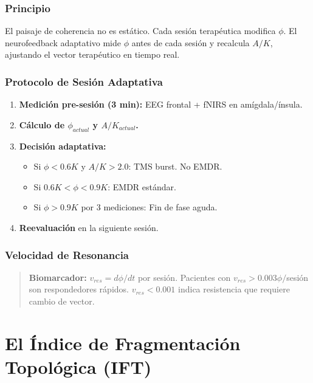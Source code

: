 \documentclass[12pt,openany]{book}
\begin{document}
\section{Principio}
El paisaje de coherencia no es estático. Cada sesión terapéutica modifica
$\phi$. El neurofeedback adaptativo mide $\phi$ antes de cada sesión y
recalcula $A/K$, ajustando el vector terapéutico en tiempo real.

\section{Protocolo de Sesión Adaptativa}
\begin{enumerate}
  \item \textbf{Medición pre-sesión (3 min):} EEG frontal + fNIRS en
        amígdala/ínsula.
  \item \textbf{Cálculo de $\phi_{actual}$ y $A/K_{actual}$.}
  \item \textbf{Decisión adaptativa:}
        \begin{itemize}
          \item Si $\phi < 0.6K$ y $A/K > 2.0$: TMS burst. No EMDR.
          \item Si $0.6K < \phi < 0.9K$: EMDR estándar.
          \item Si $\phi > 0.9K$ por 3 mediciones: Fin de fase aguda.
        \end{itemize}
  \item \textbf{Reevaluación} en la siguiente sesión.
\end{enumerate}

\section{Velocidad de Resonancia}
\begin{quote}
\textbf{Biomarcador:} $v_{res} = d\phi/dt$ por sesión. Pacientes con
$v_{res} > 0.003 \phi/$sesión son respondedores rápidos. $v_{res} <
0.001$ indica resistencia que requiere cambio de vector.
\end{quote}

\part{El Índice de Fragmentación Topológica (IFT)}
\end{document}
